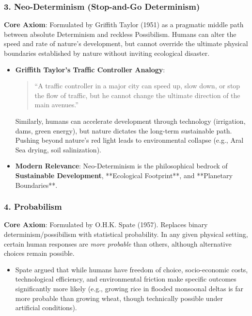 \documentclass[11pt,a4paper]{article}
\begin{document}
\subsubsection{3. Neo-Determinism (Stop-and-Go Determinism)}
\begin{keybox}
\textbf{Core Axiom}: Formulated by Griffith Taylor (1951) as a pragmatic middle path between absolute Determinism and reckless Possibilism. Humans can alter the speed and rate of nature's development, but cannot override the ultimate physical boundaries established by nature without inviting ecological disaster.
\end{keybox}

\begin{itemize}[leftmargin=*]
  \item \textbf{Griffith Taylor's Traffic Controller Analogy}:
  \begin{quote}
    ``A traffic controller in a major city can speed up, slow down, or stop the flow of traffic, but he cannot change the ultimate direction of the main avenues.''
  \end{quote}
  Similarly, humans can accelerate development through technology (irrigation, dams, green energy), but nature dictates the long-term sustainable path. Pushing beyond nature's red light leads to environmental collapse (e.g., Aral Sea drying, soil salinization).
  
  \item \textbf{Modern Relevance}: Neo-Determinism is the philosophical bedrock of \textbf{Sustainable Development}, **Ecological Footprint**, and **Planetary Boundaries**.
\end{itemize}

\subsubsection{4. Probabilism}
\begin{keybox}[Probabilism]
\textbf{Core Axiom}: Formulated by O.H.K. Spate (1957). Replaces binary determinism/possibilism with statistical probability. In any given physical setting, certain human responses are \textit{more probable} than others, although alternative choices remain possible.
\end{keybox}
\begin{itemize}[leftmargin=*]
  \item Spate argued that while humans have freedom of choice, socio-economic costs, technological efficiency, and environmental friction make specific outcomes significantly more likely (e.g., growing rice in flooded monsoonal deltas is far more probable than growing wheat, though technically possible under artificial conditions).
\end{itemize}
\end{document}
